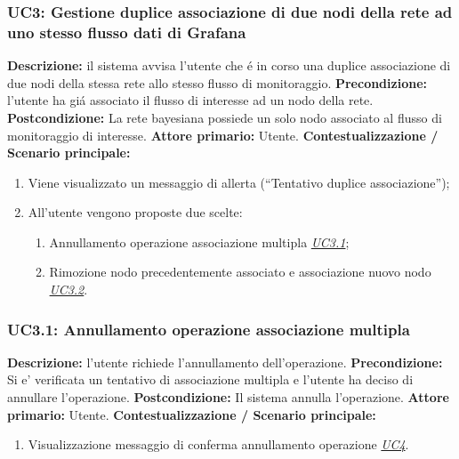                 \subsubsection{UC3: Gestione duplice associazione di due nodi della rete ad uno stesso flusso dati di Grafana}
                    \textbf{Descrizione:} il sistema avvisa l’utente che é in corso una duplice associazione di due nodi della stessa rete allo stesso flusso di monitoraggio.
                    \newline
                    \textbf{Precondizione:} l’utente ha giá associato il flusso di interesse ad un nodo della rete.
                    \newline
                    \textbf{Postcondizione:}  La rete bayesiana possiede un solo nodo associato al flusso di monitoraggio di interesse.
                    \newline
                    \textbf{Attore primario:} Utente.
                    \newline
                    \textbf{Contestualizzazione / Scenario principale:} \begin{enumerate}
                        \item Viene visualizzato un messaggio di allerta (“Tentativo duplice associazione”);
                        \item All’utente vengono proposte due scelte:
                                \begin{enumerate}
                                    \item Annullamento operazione associazione multipla \underline{\textit{UC3.1}};
                                    \item Rimozione nodo precedentemente associato e associazione nuovo nodo \underline{\textit{UC3.2}}.
                                \end{enumerate}
                    \end{enumerate}
                
                \subsubsection{UC3.1: Annullamento operazione associazione multipla}
                    \textbf{Descrizione:}  l’utente richiede l’annullamento dell’operazione.
                    \newline
                    \textbf{Precondizione:} Si e’ verificata un tentativo di associazione multipla e l’utente ha deciso di annullare l’operazione.
                    \newline
                    \textbf{Postcondizione:}  Il sistema annulla l’operazione.
                    \newline
                    \textbf{Attore primario:} Utente.
                    \newline
                    \textbf{Contestualizzazione / Scenario principale:} \begin{enumerate}
                        \item Visualizzazione messaggio di conferma annullamento operazione \underline{\textit{UC4}}.
                    \end{enumerate}
                
